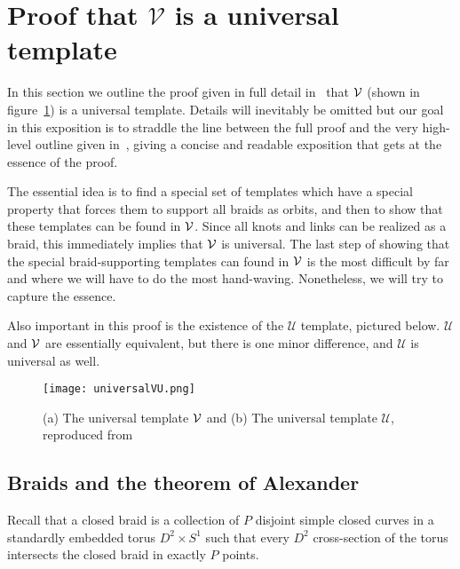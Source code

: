 \documentclass[paper.tex]{subfiles}
\begin{document}
\section{Proof that $\mathcal{V}$ is a universal template}

In this section we outline the proof given in full detail in~\cite{Ghrist1996} that $\mathcal{V}$ (shown in figure~\ref{fig:universal}) is a universal template. Details will inevitably be omitted but our goal in this exposition is to straddle the line between
the full proof and the very high-level outline given in~\cite{knottyode}, giving a concise and readable exposition that gets at the essence of the proof.

The essential idea is to find a special set of templates which have a special property that forces them to support all braids as orbits, and then to show that these templates can be found in $\mathcal{V}$. Since all knots and links
can be realized as a braid, this immediately implies that $\mathcal{V}$ is universal. The last step of showing that the special braid-supporting templates can found in $\mathcal{V}$ is the most difficult by far and where we will have to do the
most hand-waving. Nonetheless, we will try to capture the essence.

Also important in this proof is the existence of the $\mathcal{U}$ template, pictured below. $\mathcal{U}$ and $\mathcal{V}$ are essentially equivalent, but there is one minor difference, and $\mathcal{U}$ is universal as well.

\begin{figure}[h]

  \centering
  \texttt{[image: universalVU.png]}
  \caption{(a) The universal template $\mathcal{V}$ and (b) The universal template $\mathcal{U}$, reproduced from~\cite{ghs1997}}\label{fig:universal}
\end{figure}


\subsection{Braids and the theorem of Alexander}

Recall that a closed braid is a collection of $P$ disjoint simple closed curves in a standardly embedded torus $D^2 \times S^1$ such that every $D^2$ cross-section of the torus intersects the closed braid in exactly $P$ points.
\end{document}
